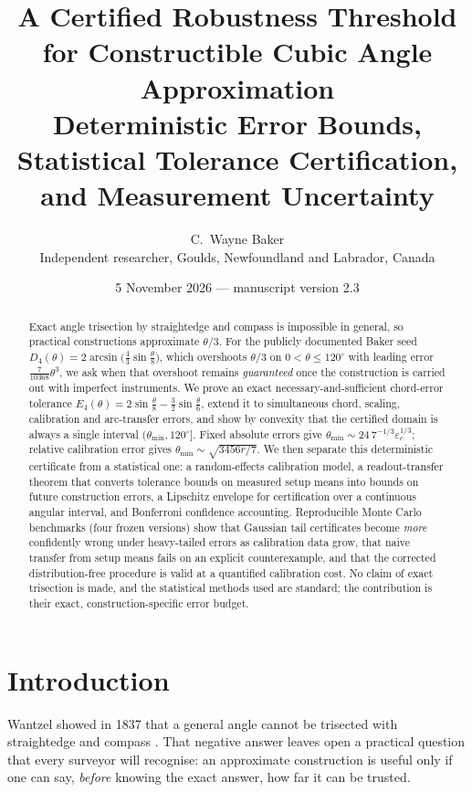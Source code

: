 \documentclass[11pt]{article}
\title{A Certified Robustness Threshold for Constructible Cubic Angle Approximation\\[4pt]
\large Deterministic Error Bounds, Statistical Tolerance Certification, and Measurement Uncertainty}
\author{C.~Wayne Baker\\ Independent researcher, Goulds, Newfoundland and Labrador, Canada}
\date{5 November 2026 --- manuscript version 2.3}
\theoremstyle{definition}
\newcommand{\eps}{\varepsilon}
\newcommand{\Dfour}{D_4}
\begin{document}
\maketitle

\begin{abstract}
Exact angle trisection by straightedge and compass is impossible in general, so practical constructions approximate $\theta/3$.
For the publicly documented Baker seed $\Dfour(\theta)=2\arcsin\!\big(\tfrac43\sin\tfrac{\theta}{8}\big)$, which overshoots $\theta/3$ on $0<\theta\le 120^\circ$ with leading error $\tfrac{7}{10368}\theta^3$, we ask when that overshoot remains \emph{guaranteed} once the construction is carried out with imperfect instruments.
We prove an exact necessary-and-sufficient chord-error tolerance $E_4(\theta)=2\sin\tfrac\theta8-\tfrac32\sin\tfrac\theta6$, extend it to simultaneous chord, scaling, calibration and arc-transfer errors, and show by convexity that the certified domain is always a single interval $(\theta_{\min},120^\circ]$.
Fixed absolute errors give $\theta_{\min}\sim 24\,7^{-1/3}\eps_c^{1/3}$; relative calibration error gives $\theta_{\min}\sim\sqrt{3456r/7}$.
We then separate this deterministic certificate from a statistical one: a random-effects calibration model, a readout-transfer theorem that converts tolerance bounds on measured setup means into bounds on future construction errors, a Lipschitz envelope for certification over a continuous angular interval, and Bonferroni confidence accounting.
Reproducible Monte Carlo benchmarks (four frozen versions) show that Gaussian tail certificates become \emph{more} confidently wrong under heavy-tailed errors as calibration data grow, that naive transfer from setup means fails on an explicit counterexample, and that the corrected distribution-free procedure is valid at a quantified calibration cost.
No claim of exact trisection is made, and the statistical methods used are standard; the contribution is their exact, construction-specific error budget.
\end{abstract}

\tableofcontents

\section{Introduction}
Wantzel showed in 1837 that a general angle cannot be trisected with straightedge and compass \cite{wantzel}.
That negative answer leaves open a practical question that every surveyor will recognise: an approximate construction is useful only if one can say, \emph{before} knowing the exact answer, how far it can be trusted.
\end{document}
